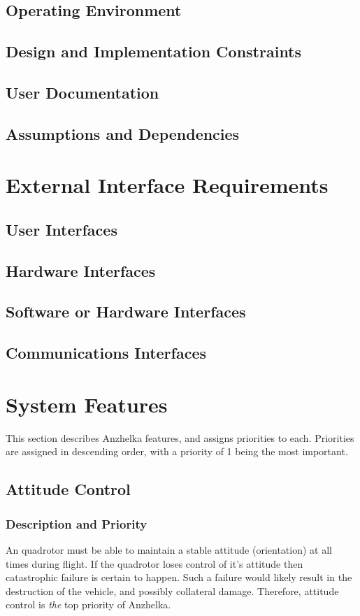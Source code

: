 \documentclass[english]{article}
\numberwithin{equation}{section} %
\begin{document}
\subsection{Operating Environment}
\subsection{Design and Implementation Constraints}
\subsection{User Documentation}
\subsection{Assumptions and Dependencies}

\newpage
\section{External Interface Requirements}
\subsection{User Interfaces}
\subsection{Hardware Interfaces}
\subsection{Software or Hardware Interfaces}
\subsection{Communications Interfaces}

\newpage
\section{System Features}

This section describes Anzhelka features, and assigns priorities to each. Priorities are assigned in descending order, with a priority of 1 being the most important.

\subsection{Attitude Control}
\subsubsection{Description and Priority}
An quadrotor must be able to maintain a stable attitude (orientation) at all times during flight. If the quadrotor loses control of it's attitude then catastrophic failure is certain to happen. Such a failure would likely result in the destruction of the vehicle, and possibly collateral damage. Therefore, attitude control is \textit{the} top priority of Anzhelka.
\end{document}

